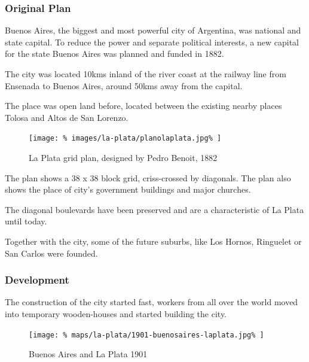 \documentclass{article}
\begin{document}
		\begin{multicols}{2}
      		\raggedcolumns
			
			\subsubsection{Original Plan}
			Buenos Aires, the biggest and most powerful city of Argentina, was national and state capital. To reduce the power and separate political interests, a new capital for the state Buenos Aires was planned and funded in 1882.
			
			The city was located 10kms inland of the river coast at the railway line from Ensenada to Buenos Aires, around 50kms away from the capital.
			
			The place was open land before, located between the existing nearby places Tolosa and Altos de San Lorenzo.
			
			\begin{figure}[H]
				\texttt{[image: \%
					images/la-plata/planolaplata.jpg\%
				]}
				\caption{La Plata grid plan, designed by Pedro Benoit, 1882  \cite{RecoletaCemetery:PedroBenoit}}
				\label{fig:img:plan-la-plata-1882}
			\end{figure}
			
			The plan shows a 38 x 38 block grid, criss-crossed by diagonals. The plan also shows the place of city’s government buildings and major churches.
			
			The diagonal boulevards have been preserved and are a characteristic of La Plata until today.
			
			Together with the city, some of the future suburbs, like Los Hornos, Ringuelet or San Carlos were founded.
			
			
			
			\subsubsection{Development}
			
			The construction of the city started fast, workers from all over the world moved into temporary wooden-houses and started building the city.			
			
			\begin{figure}[H]
				\texttt{[image: \%
					maps/la-plata/1901-buenosaires-laplata.jpg\%
				]}
				\caption{Buenos Aires and La Plata 1901  \cite{RiviereDeLaPlata}}
				\label{fig:map:buenosaires-la-plata-1901}
			\end{figure}
			

\end{multicols}
\end{document}
